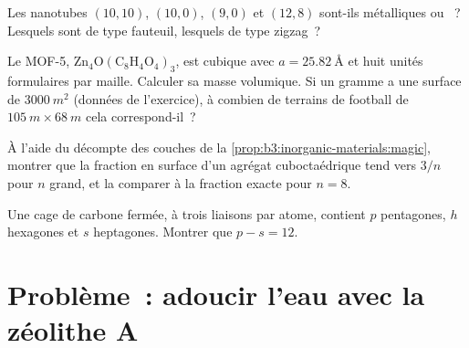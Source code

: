 \begin{exercise}[$\star\star$]\label{exo:b3:inorganic-materials:9}
Les nanotubes $(10, 10)$, $(10, 0)$, $(9, 0)$ et $(12, 8)$ sont-ils métalliques ou ~? Lesquels
sont de type fauteuil, lesquels de type zigzag~?
\end{exercise}

\begin{exercise}[$\star\star\star$]\label{exo:b3:inorganic-materials:10}
Le MOF-5, $\mathrm{Zn_4O(C_8H_4O_4)_3}$, est cubique avec $a = \qty{25.82}{\angstrom}$ et huit unités formulaires par maille.
Calculer sa masse volumique. Si un gramme a une surface de $\qty{3000}{m^2}$ (données de
l'exercice), à combien de terrains de football de $\qty{105}{m} \times \qty{68}{m}$ cela correspond-il~?
\end{exercise}

\begin{exercise}[$\star\star\star$]\label{exo:b3:inorganic-materials:11}
À l'aide du décompte des couches de la \cref{prop:b3:inorganic-materials:magic},
montrer que la fraction en surface d'un agrégat cuboctaédrique tend vers $3/n$ pour $n$ grand, et
la comparer à la fraction exacte pour $n = 8$.
\end{exercise}

\begin{exercise}[$\star\star\star$]\label{exo:b3:inorganic-materials:12}
Une cage de carbone fermée, à trois liaisons par atome, contient $p$ pentagones, $h$ hexagones
et $s$ heptagones. Montrer que $p - s = 12$.
\end{exercise}

\section{Problème~: adoucir l'eau avec la zéolithe A}

